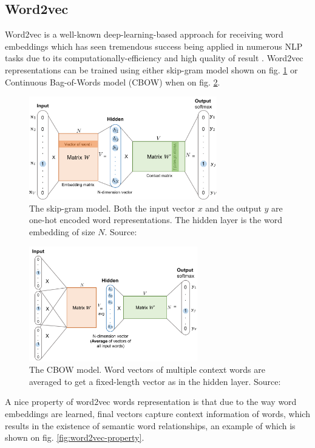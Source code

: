 \subsection{Word2vec} 
\label{sec:word2vec}
Word2vec is a well-known deep-learning-based approach for receiving word embeddings which has seen tremendous success being applied in numerous NLP tasks due to its computationally-efficiency and high quality of result \cite{Mikolov-NIPS2013}. Word2vec representations can be trained using either skip-gram model \citep{Mikolov-NIPS2013} shown on fig. \ref{fig:word2vec-skip-gram}  or Continuous Bag-of-Words model (CBOW) \citep{Mikolov-ICLR2013} when on fig. \ref{fig:word2vec-cbow}.

\begin{figure}[h]
    \centering
    \includegraphics[height=4.5cm]{Images/word2vec-skip-gram.png}
    \caption{The skip-gram model. Both the input vector $x$ and the output $y$ are one-hot encoded word representations. The hidden layer is the word embedding of size $N$. Source: \citep{Weng-2017}}
    \label{fig:word2vec-skip-gram}
\end{figure} 

\begin{figure}[h]
    \centering
    \includegraphics[height=5cm]{Images/word2vec-cbow.png}
    \caption{The CBOW model. Word vectors of multiple context words are averaged to get a fixed-length vector as in the hidden layer. Source: \citep{Weng-2017}}
    \label{fig:word2vec-cbow}
\end{figure} 

A nice property of word2vec words representation is that due to the way word embeddings are learned, final vectors capture context information of words, which results in the existence of semantic word relationships, an example of which is shown on fig. \ref{fig:word2vec-property}. 

